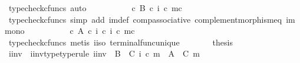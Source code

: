 \begin{isabellebody}
\ {\isacharparenleft}{\kern0pt}typecheck{\isacharunderscore}{\kern0pt}cfuncs{\isacharcomma}{\kern0pt}\ auto{\isacharparenright}{\kern0pt}\isanewline
\ \ \ \ \isamarkupfalse%
\ \isamarkupfalse%
\ {\isachardoublequoteopen}{\isachardot}{\kern0pt}{\isachardot}{\kern0pt}{\isachardot}{\kern0pt}\ {\isacharequal}{\kern0pt}\ {\isasymf}\ {\isasymcirc}\isactrlsub c\ {\isasymbeta}\isactrlbsub B\isactrlesub \ {\isasymcirc}\isactrlsub c\ {\isacharparenleft}{\kern0pt}i\ {\isasymcirc}\isactrlsub c\ m{\isacharparenright}{\kern0pt}\isactrlsup c{\isachardoublequoteclose}\isanewline
\ \ \ \ \ \ \isamarkupfalse%
\ {\isacharparenleft}{\kern0pt}typecheck{\isacharunderscore}{\kern0pt}cfuncs{\isacharcomma}{\kern0pt}\ simp\ add{\isacharcolon}{\kern0pt}\ {\isasymchi}im{\isacharunderscore}{\kern0pt}def\ comp{\isacharunderscore}{\kern0pt}associative{}\ complement{\isacharunderscore}{\kern0pt}morphism{\isacharunderscore}{\kern0pt}eq\ im{\isacharunderscore}{\kern0pt}mono{\isacharparenright}{\kern0pt}\isanewline
\ \ \ \ \isamarkupfalse%
\ \isamarkupfalse%
\ {\isachardoublequoteopen}{\isachardot}{\kern0pt}{\isachardot}{\kern0pt}{\isachardot}{\kern0pt}\ {\isacharequal}{\kern0pt}\ {\isasymf}\ {\isasymcirc}\isactrlsub c\ {\isasymbeta}\isactrlbsub A\isactrlesub \ {\isasymcirc}\isactrlsub c\ {\isacharparenleft}{\kern0pt}i\isactrlbold {\isasyminverse}\ {\isasymcirc}\isactrlsub c\ {\isacharparenleft}{\kern0pt}i\ {\isasymcirc}\isactrlsub c\ m{\isacharparenright}{\kern0pt}\isactrlsup c{\isacharparenright}{\kern0pt}{\isachardoublequoteclose}\isanewline
\ \ \ \ \ \ \isamarkupfalse%
\ {\isacharparenleft}{\kern0pt}typecheck{\isacharunderscore}{\kern0pt}cfuncs{\isacharcomma}{\kern0pt}\ metis\ i{\isacharunderscore}{\kern0pt}iso\ terminal{\isacharunderscore}{\kern0pt}func{\isacharunderscore}{\kern0pt}unique{\isacharparenright}{\kern0pt}\isanewline
\ \ \ \ \isamarkupfalse%
\ \isamarkupfalse%
\ {\isacharquery}{\kern0pt}thesis\isacommand{{\isachardot}{\kern0pt}}\isamarkupfalse%
\isanewline
\ \ \isamarkupfalse%
\isanewline
\ \ \isamarkupfalse%
\ \isamarkupfalse%
\ i{\isacharprime}{\kern0pt}{\isacharunderscore}{\kern0pt}inv\ \ i{\isacharprime}{\kern0pt}{\isacharunderscore}{\kern0pt}inv{\isacharunderscore}{\kern0pt}type{\isacharbrackleft}{\kern0pt}type{\isacharunderscore}{\kern0pt}rule{\isacharbrackright}{\kern0pt}{\isacharcolon}{\kern0pt}\ {\isachardoublequoteopen}i{\isacharprime}{\kern0pt}{\isacharunderscore}{\kern0pt}inv\ {\isacharcolon}{\kern0pt}\ B\ {\isasymsetminus}\ {\isacharparenleft}{\kern0pt}C{\isacharcomma}{\kern0pt}\ i\ {\isasymcirc}\isactrlsub c\ m{\isacharparenright}{\kern0pt}\ {\isasymrightarrow}\ A\ {\isasymsetminus}\ {\isacharparenleft}{\kern0pt}C{\isacharcomma}{\kern0pt}\ m{\isacharparenright}{\kern0pt}{\isachardoublequoteclose}\isanewline

\end{isabellebody}
